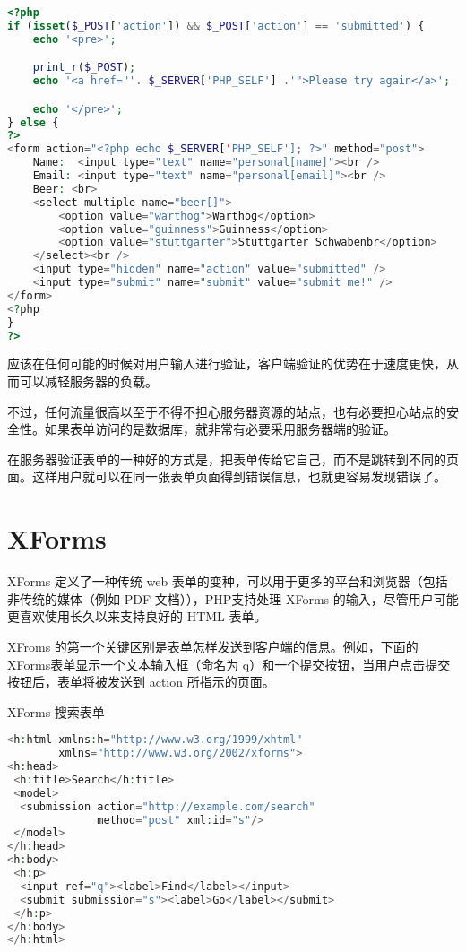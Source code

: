 \begin{lstlisting}[language=PHP]
<?php
if (isset($_POST['action']) && $_POST['action'] == 'submitted') {
    echo '<pre>';

    print_r($_POST);
    echo '<a href="'. $_SERVER['PHP_SELF'] .'">Please try again</a>';

    echo '</pre>';
} else {
?>
<form action="<?php echo $_SERVER['PHP_SELF']; ?>" method="post">
    Name:  <input type="text" name="personal[name]"><br />
    Email: <input type="text" name="personal[email]"><br />
    Beer: <br>
    <select multiple name="beer[]">
        <option value="warthog">Warthog</option>
        <option value="guinness">Guinness</option>
        <option value="stuttgarter">Stuttgarter Schwabenbr</option>
    </select><br />
    <input type="hidden" name="action" value="submitted" />
    <input type="submit" name="submit" value="submit me!" />
</form>
<?php
}
?>
\end{lstlisting}






应该在任何可能的时候对用户输入进行验证，客户端验证的优势在于速度更快，从而可以减轻服务器的负载。


不过，任何流量很高以至于不得不担心服务器资源的站点，也有必要担心站点的安全性。如果表单访问的是数据库，就非常有必要采用服务器端的验证。

在服务器验证表单的一种好的方式是，把表单传给它自己，而不是跳转到不同的页面。这样用户就可以在同一张表单页面得到错误信息，也就更容易发现错误了。



\section{XForms}

XForms 定义了一种传统 web 表单的变种，可以用于更多的平台和浏览器（包括非传统的媒体（例如 PDF 文档）），PHP支持处理 XForms 的输入，尽管用户可能更喜欢使用长久以来支持良好的 HTML 表单。

XFroms 的第一个关键区别是表单怎样发送到客户端的信息。例如，下面的XForms表单显示一个文本输入框（命名为 q）和一个提交按钮，当用户点击提交按钮后，表单将被发送到 action 所指示的页面。

\begin{example}
XForms 搜索表单
\begin{lstlisting}[language=PHP]
<h:html xmlns:h="http://www.w3.org/1999/xhtml"
        xmlns="http://www.w3.org/2002/xforms">
<h:head>
 <h:title>Search</h:title>
 <model>
  <submission action="http://example.com/search"
              method="post" xml:id="s"/>
 </model>
</h:head>
<h:body>
 <h:p>
  <input ref="q"><label>Find</label></input>
  <submit submission="s"><label>Go</label></submit>
 </h:p>
</h:body>
</h:html>
\end{lstlisting}
\end{example}

